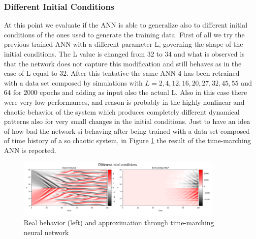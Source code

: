 \documentclass[]{article}
\begin{document}
\subsubsection{Different Initial Conditions}
At this point we evaluate  if the ANN is able to generalize also to different initial conditions of the ones used to generate the training data. First of all we try the previous trained ANN with a different parameter L, governing the shape of the initial conditions. The L value is changed from $32$ to $34$ and what is observed is that the network does not capture this modification and still behaves as in the case of L equal to $32$. After this tentative the same ANN 4 has been retrained with a data set composed by simulations with $L = 2, 4, 12, 16, 20, 27, 32, 45, 55$ and $64$ for $2000$ epochs and adding as input also the actual L. Also in this case there were very low performances, and reason is probably in the highly nonlinear and chaotic behavior of the system which produces completely different dynamical patterns also for very small changes in the initial conditions. Just to have an idea of how bad the network si behaving after being trained with a data set composed of time history of a so chaotic system, in Figure \ref{fig:fig9} the result of the time-marching ANN is reported.
\begin{figure}[!t]
	\centering
	\includegraphics[width=0.9\textwidth]{../figures/fore_diff_ic2.pdf}
	\caption{Real behavior (left) and approximation through time-marching neural network}
	\label{fig:fig9}
\end{figure}
\newpage
\end{document}
